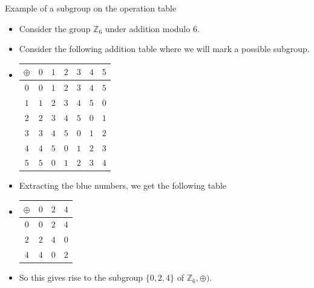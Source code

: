 \documentclass[ %
 10pt, xcolor={dvipsnames,svgnames,x11names,hyperref},
   hyperref={colorlinks=true,citecolor=green,linkcolor=DarkRed,urlcolor=ProcessBlue,anchorcolor=blue}
  ]{beamer}
\newenvironment{stepitemize}{\begin{itemize}[<+->]}{\end{itemize} }
\newcommand{\Z}{\mathbb{Z}}
\begin{document}
\begin{frame}{Example of a subgroup on the operation table}
\begin{stepitemize}
\item Consider the group $\Z_6$ under addition modulo $6$.
\item Consider the following addition table where we will mark a possible subgroup.
\item[]
\begin{table}[H]
\begin{tabular}{ c| c | c |c|c|c|c}
$\oplus$  & {\color{blue} $0$} & $1$ & {\color{blue} $2$} & $3$ & {\color{blue} $4$} & $5$\\
\hline
{\color{blue} $0$}&{\color{blue} $0$} & $1$ & {\color{blue} $2$} & $3$ & {\color{blue} $4$} & $5$\\
\hline
$1$&$1$ & $2$ & $3$ & $4$ & $5$ & $0$\\
\hline
{\color{blue} $2$} &{\color{blue} $2$} & $3$ & {\color{blue} $4$} & $5$ & {\color{blue} $0$} & $1$\\
\hline
$3$&$3$ & $4$ & $5$ & $0$ & $1$ & $2$\\
\hline
{\color{blue} $4$}&{\color{blue} $4$} & $5$ & {\color{blue} $0$} & $1$ & {\color{blue} $2$} & $3$\\
\hline
$5$&$5$ & $0$ & $1$ & $2$ & $3$ & $4$\\
\end{tabular}
\end{table}
\item Extracting the blue numbers, we get the following table
\item[]
\begin{table}[H]
\begin{tabular}{ c| c | c |c}
$\oplus$  & {\color{blue} $0$} & {\color{blue} $2$} &  {\color{blue} $4$}\\
\hline
{\color{blue} $0$}&{\color{blue} $0$} & {\color{blue} $2$} & {\color{blue} $4$}\\
\hline
{\color{blue} $2$} &{\color{blue} $2$} & {\color{blue} $4$} & {\color{blue} $0$}\\
\hline
{\color{blue} $4$}&{\color{blue} $4$} & {\color{blue} $0$} & {\color{blue} $2$}\\
\end{tabular}
\end{table}
\item So this gives rise to the subgroup $\{0,2,4\}$ of $\Z_6, \oplus)$. 
\end{stepitemize}
    
\end{frame}
\end{document}
